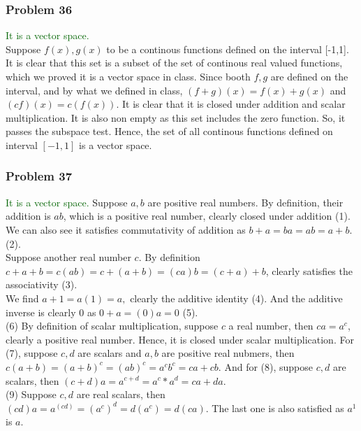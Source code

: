 \documentclass[a4paper,12pt]{article}
\begin{document}
\subsubsection*{Problem 36}
\textcolor{darkgreen}{It is a vector space.}\\
Suppose $f(x),g(x)$ to be a continous functions defined on the interval [-1,1]. It is clear that this set is a subset of the set of continous real valued functions, which we proved it is a vector space in class. 
Since booth $f,g$ are defined on the interval, and by what we defined in class, $(f+g)(x)=f(x)+g(x)$ and $(cf)(x)=c(f(x)).$ It is clear that it is closed under addition and scalar multiplication. It is also non empty as this set includes the zero function. So, it passes the subspace test. Hence, the set of all continous functions defined on interval $[-1,1]$ is a vector space. \\

\subsubsection*{Problem 37}
\textcolor{darkgreen}{It is a vector space.}
Suppose $a,b$ are positive real numbers. By definition, their addition is $ab$, which is a positive real number, clearly closed under addition (1). We can also see it satisfies commutativity of addition as $b+a=ba=ab=a+b.$ (2).\\
Suppose another real number $c$. By definition $c+a+b=c(ab)=c+(a+b)=(ca)b=(c+a)+b$, clearly satisfies the associativity (3).\\
We find $a+1=a(1)=a,$ clearly the additive identity (4). And the additive inverse is clearly $0$ as $0+a=(0)a=0$ (5).\\
(6) By definition of scalar multiplication, suppose $c$ a real number, then $ca=a^c$, clearly a positive real number. Hence, it is closed under scalar multiplication. For (7), suppose $c,d$ are scalars and $a,b$ are positive real nubmers, then $c(a+b)=(a+b)^c=(ab)^c=a^c b^c=ca+cb.$ And for (8), suppose $c,d$ are scalars, then $(c+d)a=a^{c+d}=a^c*a^d=ca+da.$\\
(9) Suppose $c,d$  are real scalars, then $(cd)a=a^{(cd)}=(a^c)^d=d(a^c)=d(ca).$ The last one is also satisfied as $a^1$ is $a$.
\end{document}
